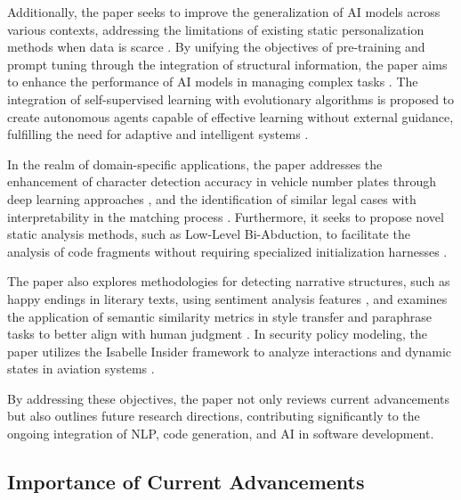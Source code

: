 Additionally, the paper seeks to improve the generalization of AI models across various contexts, addressing the limitations of existing static personalization methods when data is scarce \cite{kaur2024cropcontextwiserobuststatic}. By unifying the objectives of pre-training and prompt tuning through the integration of structural information, the paper aims to enhance the performance of AI models in managing complex tasks \cite{ge2024psppretrainingstructureprompt}. The integration of self-supervised learning with evolutionary algorithms is proposed to create autonomous agents capable of effective learning without external guidance, fulfilling the need for adaptive and intelligent systems \cite{le2019evolvingselfsupervisedneuralnetworks}.



In the realm of domain-specific applications, the paper addresses the enhancement of character detection accuracy in vehicle number plates through deep learning approaches \cite{adak2022automaticnumberplaterecognition}, and the identification of similar legal cases with interpretability in the matching process \cite{lin2023interpretabilityframeworksimilarcase}. Furthermore, it seeks to propose novel static analysis methods, such as Low-Level Bi-Abduction, to facilitate the analysis of code fragments without requiring specialized initialization harnesses \cite{holk2022lowlevelbiabduction}.



The paper also explores methodologies for detecting narrative structures, such as happy endings in literary texts, using sentiment analysis features \cite{jannidis2016analyzingfeaturesdetectionhappy}, and examines the application of semantic similarity metrics in style transfer and paraphrase tasks to better align with human judgment \cite{yamshchikov2020styletransferparaphraselookingsensible}. In security policy modeling, the paper utilizes the Isabelle Insider framework to analyze interactions and dynamic states in aviation systems \cite{kammller2020applyingisabelleinsiderframework}.



By addressing these objectives, the paper not only reviews current advancements but also outlines future research directions, contributing significantly to the ongoing integration of NLP, code generation, and AI in software development.



\subsection{Importance of Current Advancements} \label{subsec:Importance of Current Advancements}

